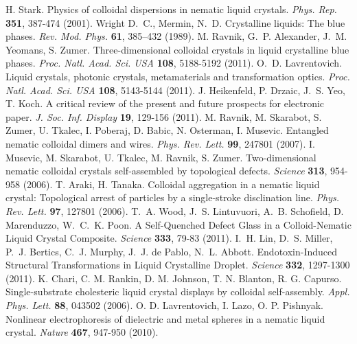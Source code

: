 \documentclass[12pt]{article}
\begin{document}
\begin{thebibliography}{99}
 H. Stark. Physics of
colloidal dispersions in nematic liquid crystals. 
{\it Phys. Rep.} {\bf 351}, 387-474 (2001).
 Wright D.~C., Mermin, N.~D. Crystalline liquids: The blue phases. {\it Rev. Mod. Phys.} {\bf 61}, 385–432 (1989).
 M. Ravnik, G.~P. Alexander, J.~M. Yeomans,  
S. Zumer.  Three-dimensional colloidal crystals in liquid crystalline 
blue phases. {\it Proc. Natl. Acad. Sci. USA} {\bf 108}, 5188-5192 (2011).
 O.~D. Lavrentovich.
 Liquid crystals, photonic crystals, metamaterials and transformation optics. 
{\it Proc. Natl. Acad. Sci. USA} {\bf 108}, 5143-5144 (2011).
 J. Heikenfeld, P. Drzaic,  J.~S. Yeo, T. Koch.
A critical review of the present and future prospects for electronic paper.
{\it J. Soc. Inf. Display} {\bf 19}, 129-156 (2011).
 M. Ravnik, M. Skarabot, S. Zumer, U. Tkalec, I. Poberaj, D. Babic, N. Osterman, I. Musevic.  Entangled nematic colloidal dimers and wires. 
{\it Phys. Rev. Lett.} {\bf 99}, 247801 (2007).
 I. Musevic, M. Skarabot, U. Tkalec, M. Ravnik,
S. Zumer. Two-dimensional nematic colloidal crystals self-assembled by topological defects. {\it Science} {\bf 313}, 954-958 (2006).
 T. Araki, H. Tanaka.  Colloidal aggregation in a nematic liquid crystal: Topological arrest of particles by a single-stroke disclination line. {\it Phys. Rev. Lett.} {\bf 97}, 127801 (2006).
 T.~A. Wood, J.~S. Lintuvuori, A.~B. Schofield, D. Marenduzzo,
W.~C.~K. Poon. A Self-Quenched Defect Glass in a Colloid-Nematic Liquid Crystal Composite. {\it Science} {\bf 333}, 79-83 (2011).
 I.~H. Lin, D.~S. Miller, P.~J. Bertics, C.~J. Murphy, J.~J. de Pablo, N.~L. Abbott. Endotoxin-Induced Structural Transformations in Liquid Crystalline Droplet. {\it Science} {\bf 332}, 1297-1300 (2011).
 K. Chari, C. M. Rankin, D. M. Johnson, T. N. Blanton,
R. G. Capurso. Single-substrate cholesteric liquid crystal displays by colloidal self-assembly. {\it Appl. Phys. Lett.} {\bf 88}, 043502 (2006).
  O. D. Lavrentovich,	I. Lazo, O. P. Pishnyak.
Nonlinear electrophoresis of dielectric and metal spheres in a nematic liquid 
crystal. {\it Nature} {\bf 467}, 947-950 (2010).

\end{thebibliography}
\end{document}
